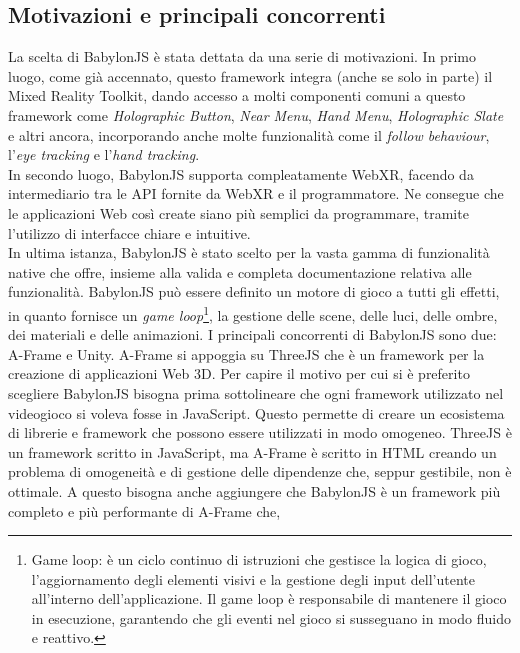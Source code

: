 \subsection{Motivazioni e principali concorrenti}\label{subsec:BabylonJS_motivazioni}
La scelta di BabylonJS è stata dettata da una serie di motivazioni. In primo luogo, come già accennato, questo framework integra (anche se solo in parte) il Mixed Reality
Toolkit, dando accesso a molti componenti comuni a questo framework come \textit{Holographic Button}, \textit{Near Menu}, \textit{Hand Menu}, \textit{Holographic Slate} e altri 
ancora, incorporando anche molte funzionalità come il \textit{follow behaviour}, l'\textit{eye tracking} e l'\textit{hand tracking}.\\
In secondo luogo, BabylonJS supporta compleatamente WebXR, facendo da intermediario tra le API fornite da WebXR e il programmatore. Ne consegue che le applicazioni Web così
create siano più semplici da programmare, tramite l'utilizzo di interfacce chiare e intuitive.\\
In ultima istanza, BabylonJS è stato scelto per la vasta gamma di funzionalità native che offre, insieme alla valida e completa documentazione relativa alle funzionalità. BabylonJS
può essere definito un motore di gioco a tutti gli effetti, in quanto fornisce un \textit{game loop}\footnote{
    Game loop: è un ciclo continuo di istruzioni che gestisce la logica di gioco, l'aggiornamento degli elementi visivi e la gestione degli input dell'utente all'interno 
    dell'applicazione. Il game loop è responsabile di mantenere il gioco in esecuzione, garantendo che gli eventi nel gioco si  susseguano in modo fluido e reattivo.
    }, la gestione delle scene, delle luci, delle ombre, dei materiali e 
    delle animazioni.
    \newline \newline
    I principali concorrenti di BabylonJS sono due: A-Frame e Unity. A-Frame si appoggia su ThreeJS che è un framework per la creazione di applicazioni Web 3D. Per capire il motivo per
    cui si è preferito scegliere BabylonJS bisogna prima sottolineare che ogni framework utilizzato nel videogioco si voleva fosse in JavaScript. Questo permette di creare un ecosistema
    di librerie e framework che possono essere utilizzati in modo omogeneo. ThreeJS è un framework scritto in JavaScript, ma A-Frame è scritto in HTML creando un problema di omogeneità
    e di gestione delle dipendenze che, seppur gestibile, non è ottimale. A questo bisogna anche aggiungere che BabylonJS è un framework più completo e più performante di A-Frame che,
